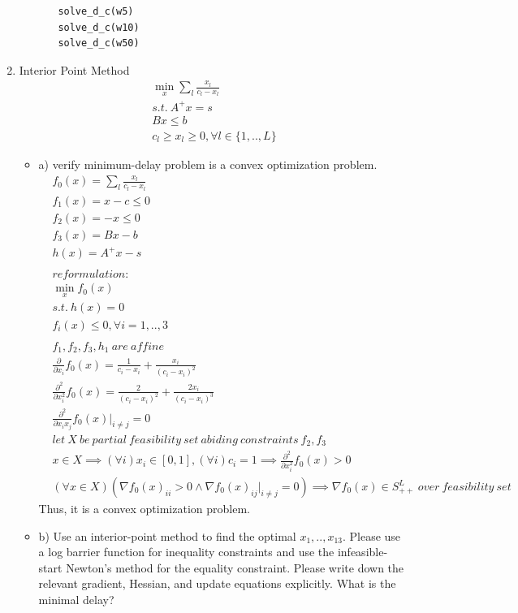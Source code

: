 \documentclass[12pt,letter]{article}
\newcommand{\set}[1]{\{#1\}}
\begin{document}
\begin{enumerate}
\begin{enumerate}
\begin{itemize}
\begin{Verbatim}[fontsize=\small]
solve_d_c(w5)
solve_d_c(w10)
solve_d_c(w50)
\end{Verbatim}
    \end{itemize}
    \pagebreak    
  \end{enumerate}
\item Interior Point Method
  \begin{align*}
    \min_x \sum_l \frac{x_l}{c_l-x_l}\\
    s.t.\ A^+x = s\\
    Bx \leq b\\
    c_l \geq x_l \geq 0, \forall l \in \set{1,..,L}
  \end{align*}
  \begin{itemize}
  \item a) verify minimum-delay problem is a convex optimization problem.\\
    \begin{align*}
      &f_0(x) = \sum_l \frac{x_l}{c_l-x_l}\\
      &f_1(x) = x - c \leq 0\\
      &f_2(x) = -x \leq 0\\
      &f_3(x) = Bx - b\\
      &h(x) = A^+x -s\\
      \\
      &reformulation:\\
      &\min_x f_0(x)\\
      &s.t.\ h(x) = 0\\
      &f_i(x) \leq 0, \forall i=1,..,3\\
      \\
      &f_1,f_2,f_3,h_1\ are\ affine\\
      &\frac{\partial}{\partial x_i} f_0(x) = \frac{1}{c_i-x_i} + \frac{x_i}{(c_i-x_i)^2}\\
      &\frac{\partial^2}{\partial x_i^2} f_0(x) = \frac{2}{(c_i-x_i)^2} + \frac{2x_i}{(c_i-x_i)^3}\\
      &\frac{\partial^2}{\partial x_i x_j} f_0(x)|_{i\not=j} = 0\\
      &let\ X\ be\ partial\ feasibility\ set\ abiding\ constraints\ f_2, f_3\\
      &x\in X \implies (\forall i)x_i\in [0,1], (\forall i) c_i = 1\implies \frac{\partial^2}{\partial x_i^2} f_0(x) > 0\\
      &(\forall x\in X) (\nabla f_0(x)_{ii} > 0 \wedge \nabla f_0(x)_{ij}|_{i\not=j} = 0) \implies \nabla f_0(x) \in S_{++}^L\ over\ feasibility\ set
    \end{align*}
    Thus, it is a convex optimization problem.
    \pagebreak
  \item b) Use an interior-point method to find the optimal $x_1,..,x_{13}$. Please use a log barrier function for inequality constraints and use the infeasible-start Newton’s method for the equality constraint. Please write down the relevant gradient, Hessian, and update equations explicitly. What is the minimal delay?


\end{itemize}
\end{enumerate}
\end{document}
